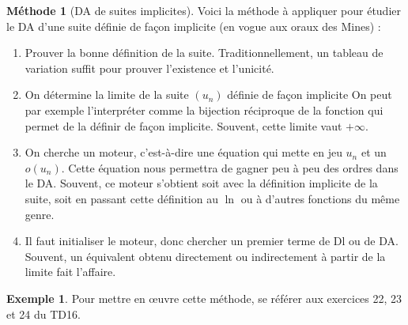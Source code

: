 \documentclass[french]{book}
\theoremstyle{plain}
\theoremstyle{definition}
\newtheorem{exa}{Exemple}[chapter]
\newtheorem{met}{Méthode}[chapter]
\theoremstyle{remark}
\begin{document}
\begin{met}[DA de suites implicites]
	Voici la méthode à appliquer pour étudier le DA d'une suite définie de façon implicite (en vogue aux oraux des Mines) :
	\begin{enumerate}
		\item Prouver la bonne définition de la suite. Traditionnellement, un tableau de variation suffit pour prouver l'existence et l'unicité.
		\item On détermine la limite de la suite $(u_n)$ définie de façon implicite On peut par exemple l'interpréter comme la bijection réciproque de la fonction qui permet de la définir de façon implicite. Souvent, cette limite vaut $+\infty$.
		\item On cherche un moteur, c'est-à-dire une équation qui mette en jeu $u_n$ et un $o(u_n)$. Cette équation nous permettra de gagner peu à peu des ordres dans le DA. Souvent, ce moteur s'obtient soit avec la définition implicite de la suite, soit en passant cette définition au $\ln$ ou à d'autres fonctions du même genre.
		\item Il faut initialiser le moteur, donc chercher un premier terme de Dl ou de DA. Souvent, un équivalent obtenu directement ou indirectement à partir de la limite fait l'affaire.
	\end{enumerate}
\end{met}
\begin{exa}
	Pour mettre en œuvre cette méthode, se référer aux exercices 22, 23 et 24 du TD16.
\end{exa}
\end{document}
